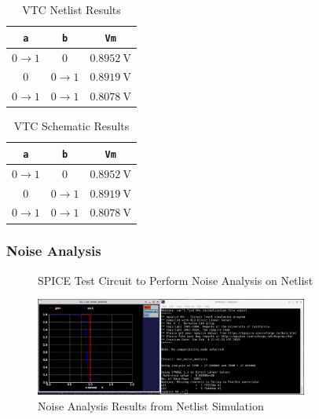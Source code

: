 \documentclass{article}
\begin{document}
	\begin{table}[H]
	\begin{center}
	\caption{VTC Netlist Results}
	\label{table::nor_vtc_netlist}
	\begin{tabular}{| c | c | c |}
		\hline
		\texttt{a} & \texttt{b} & \texttt{Vm}\\
		\hline	
		$0 \rightarrow 1$ & $0$ & $0.8952\ \text{V}$\\
		\hline	
		$0$ & $0 \rightarrow 1$ & $0.8919\ \text{V}$\\
		\hline	
		$0 \rightarrow 1$ & $0 \rightarrow 1$ & $0.8078\ \text{V}$\\
		\hline
	\end{tabular}
	\end{center}
	\end{table}
	
	\begin{table}[H]
	\begin{center}
	\caption{VTC Schematic Results}
	\label{table::nor_vtc_schematic}
	\begin{tabular}{| c | c | c |}
		\hline
		\texttt{a} & \texttt{b} & \texttt{Vm}\\
		\hline	
		$0 \rightarrow 1$ & $0$ & $0.8952\ \text{V}$\\
		\hline	
		$0$ & $0 \rightarrow 1$ & $0.8919\ \text{V}$\\
		\hline	
		$0 \rightarrow 1$ & $0 \rightarrow 1$ & $0.8078\ \text{V}$\\
		\hline
	\end{tabular}
	\end{center}
	\end{table}
	
	\subsubsection{Noise Analysis}
	
	\begin{figure}[H]
		
		\caption{SPICE Test Circuit to Perform Noise Analysis on Netlist}
		\label{fig::nor_noise_analysis_test_circuit}
	\end{figure}
	
	\begin{figure}[H]
		\centerline{\includegraphics[width=0.8\textwidth]{nor_noise_analysis.png}}
		\caption{Noise Analysis Results from Netlist Simulation}
		\label{fig::nor_noise_analysis}
	\end{figure}
	
\end{document}
